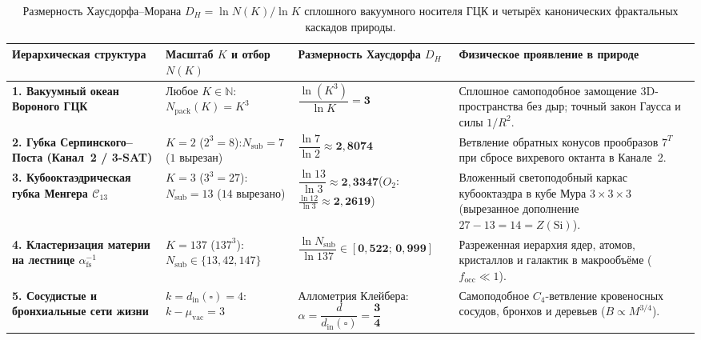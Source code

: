 \begin{table}[htbp]
\centering
\caption{Размерность Хаусдорфа--Морана $D_H = \ln N(K)/\ln K$ сплошного вакуумного носителя ГЦК и четырёх канонических фрактальных каскадов природы.}
\label{tab:course-hausdorff-fractals}
\footnotesize
\begin{tabular}{@{}p{}p{}p{}p{}@{}}
\toprule
\textbf{Иерархическая структура} & \textbf{Масштаб $K$ и отбор $N(K)$} & \textbf{Размерность Хаусдорфа $D_H$} & \textbf{Физическое проявление в природе} \\
\midrule
\textbf{1. Вакуумный океан Вороного ГЦК} &
Любое $K\in\mathbb{N}$:\newline $N_{\mathrm{pack}}(K) = K^3$ &
$\dfrac{\ln(K^3)}{\ln K} = \mathbf{3}$ &
Сплошное самоподобное замощение 3D-пространства без дыр; точный закон Гаусса и силы $1/R^2$. \\
\addlinespace[3pt]
\textbf{2. Губка Серпинского--Поста (Канал~2 / 3-SAT)} &
$K = 2$ ($2^3=8$):\newline $N_{\mathrm{sub}} = 7$ ($1$ вырезан) &
$\dfrac{\ln 7}{\ln 2} \approx \mathbf{2{,}8074}$ &
Ветвление обратных конусов прообразов $7^T$ при сбросе вихревого октанта в Канале~2. \\
\addlinespace[3pt]
\textbf{3. Кубооктаэдрическая губка Менгера $\mathcal{C}_{13}$} &
$K = 3$ ($3^3=27$):\newline $N_{\mathrm{sub}} = 13$ ($14$ вырезано) &
$\dfrac{\ln 13}{\ln 3} \approx \mathbf{2{,}3347}$\newline ($O_2$: $\frac{\ln 12}{\ln 3}\approx \mathbf{2{,}2619}$) &
Вложенный светоподобный каркас кубооктаэдра в кубе Мура $3\times 3\times 3$ (вырезанное дополнение $27-13=14=Z(\mathrm{Si})$). \\
\addlinespace[3pt]
\textbf{4. Кластеризация материи на лестнице $\alpha_{\mathrm{fs}}^{-1}$} &
$K = 137$ ($137^3$):\newline $N_{\mathrm{sub}}\in\{13,42,147\}$ &
$\dfrac{\ln N_{\mathrm{sub}}}{\ln 137} \in \mathbf{[0{,}522;\,0{,}999]}$ &
Разреженная иерархия ядер, атомов, кристаллов и галактик в макрообъёме ($f_{\mathrm{occ}}\ll 1$). \\
\addlinespace[3pt]
\textbf{5. Сосудистые и бронхиальные сети жизни} &
$k = d_{\mathrm{in}}(\square) = 4$:\newline $k - \mu_{\mathrm{vac}} = 3$ &
Аллометрия Клейбера:\newline $\alpha = \dfrac{d}{d_{\mathrm{in}}(\square)} = \mathbf{\dfrac{3}{4}}$ &
Самоподобное $C_4$-ветвление кровеносных сосудов, бронхов и деревьев ($B\propto M^{3/4}$). \\
\bottomrule
\end{tabular}
\end{table}

